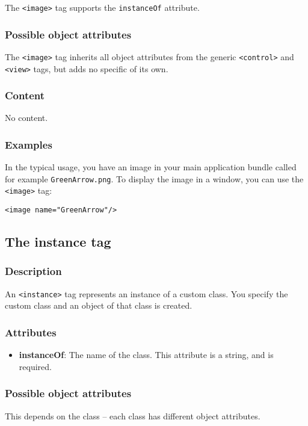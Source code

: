 The \texttt{<image>} tag supports the \texttt{instanceOf} attribute.

\subsubsection{Possible object attributes}
The \texttt{<image>} tag inherits all object attributes from the
generic \texttt{<control>} and \texttt{<view>} tags, but adds no
specific of its own.

\subsubsection{Content}
No content.

\subsubsection{Examples}
In the typical usage, you have an image in your main application
bundle called for example \texttt{GreenArrow.png}.  To display the
image in a window, you can use the \texttt{<image>} tag:
\begin{verbatim}
<image name="GreenArrow"/>
\end{verbatim}

\subsection{The instance tag}

\subsubsection{Description}
An \texttt{<instance>} tag represents an instance of a custom class.  You
specify the custom class and an object of that class is created.

\subsubsection{Attributes}
\begin{itemize}
\item {\bf instanceOf}: The name of the class.  This attribute is a string, 
and is required.
\end{itemize}

\subsubsection{Possible object attributes}
This depends on the class -- each class has different object attributes.

